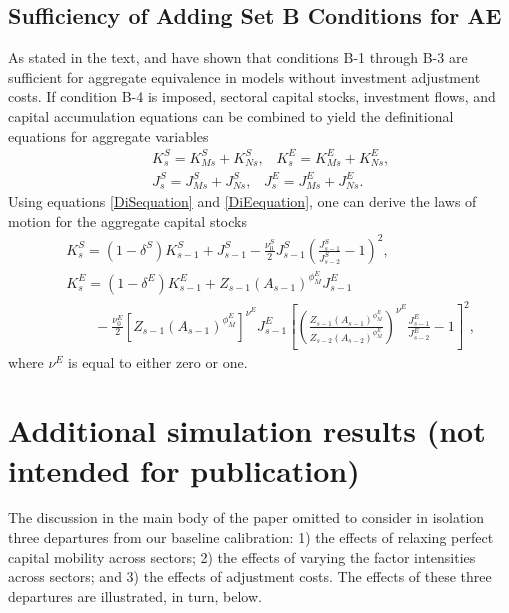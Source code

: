 \documentclass[12pt,fleqn]{article}
\begin{document}
\subsection{Sufficiency of Adding Set B Conditions for AE}

As stated in the text,  and  have shown that conditions B-1
through B-3 are sufficient for aggregate equivalence in models without
investment adjustment costs. If condition B-4 is imposed, sectoral capital
stocks, investment flows, and capital accumulation equations can be combined
to yield the definitional equations for aggregate variables
\begin{eqnarray}
&&K_{s}^{S}=K_{Ms}^{S}+K_{Ns}^{S}, \,\,\,\,\, K_{s}^{E}=K_{Ms}^{E}+K_{Ns}^{E}, \\
&&J_{s}^{S}=J_{Ms}^{S}+J_{Ns}^{S}, \,\,\,\,\, J_{s}^{E}=J_{Ms}^{E}+J_{Ns}^{E}.
\end{eqnarray}%
Using equations \ref{DiSequation} and \ref{DiEequation}, one can derive the laws of motion for the aggregate capital stocks
\begin{eqnarray}
&&K_{s}^{S}=\left( 1-\delta ^{S}\right) K_{s-1}^{S}+J_{s-1}^{S} - \frac{\nu_{0}^{S}}{2}J_{s-1}^{S}\left( \frac{J_{s-1}^{S}}{J_{s-2}^{S}}-1\right) ^{2},\\
&&K_{s}^{E}=\left( 1-\delta ^{E}\right) K_{s-1}^{E}+Z_{s-1}\left(A_{s-1}\right) ^{\phi _{M}^{E}}J_{s-1}^{E} \nonumber \\
&&\ \ \ \ \ \ \ \ \ -\frac{\nu _{0}^{E}}{2}\left[ Z_{s-1}\left(A_{s-1}\right) ^{\phi _{M}^{E}}\right] ^{\nu ^{E}}J_{s-1}^{E}
\left[ \left( \frac{Z_{s-1}\left( A_{s-1}\right) ^{\phi _{M}^{E}}}{Z_{s-2}\left(A_{s-2}\right) ^{\phi _{M}^{E}}}\right) ^{\nu ^{E}}\frac{J_{s-1}^{E}}{J_{s-2}^{E}}-1\right] ^{2},%
\end{eqnarray}%
where $\nu ^{E}$ is equal to either zero or one.

\clearpage



\section{Additional simulation results (not intended for publication)} \label{appendix_extra_figures}

The discussion in the main body of the paper omitted to
consider in isolation three departures from our baseline calibration: 1)
the effects of relaxing perfect capital mobility across sectors; 2) the effects
of varying the factor intensities across sectors; and 3) the effects of adjustment costs.
The effects of these three departures are illustrated, in turn,
below.
\end{document}
